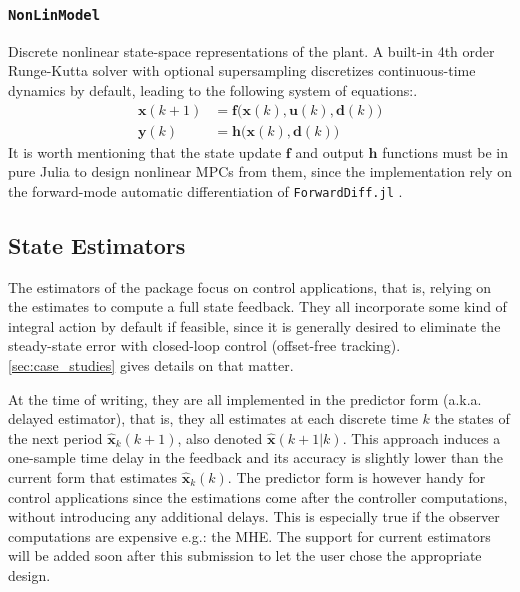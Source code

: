 \subsubsection{\textnormal{\texttt{NonLinModel}}}

Discrete nonlinear state-space representations of the plant. A built-in 4th order Runge-Kutta solver with optional supersampling discretizes continuous-time dynamics by default, leading to the following system of equations:. 
\begin{subequations}
\begin{align}
    \mathbf{x}(k+1) &= \mathbf{f}\big(\mathbf{x}(k), \mathbf{u}(k), \mathbf{d}(k)\big) \\
    \mathbf{y}(k)   &= \mathbf{h}\big( \mathbf{x}(k), \mathbf{d}(k) \big)
\end{align}
\end{subequations}
It is worth mentioning that the state update $\mathbf{f}$ and output $\mathbf{h}$ functions must be in pure Julia to design nonlinear MPCs from them, since the implementation rely on the forward-mode automatic differentiation of \texttt{ForwardDiff.jl} \citep{forwardDiff}.

\subsection{State Estimators}

The estimators of the package focus on control applications, that is, relying on the estimates to compute a full state feedback. They all incorporate some kind of integral action by default if feasible, since it is generally desired to eliminate the steady-state error with closed-loop control (offset-free tracking). \cref{sec:case_studies} gives details on that matter.

At the time of writing, they are all implemented in the predictor form (a.k.a. delayed estimator), that is, they all estimates at each discrete time $k$ the states of the next period $\mathbf{\hat{x}}_k(k+1)$, also denoted $\mathbf{\hat{x}}(k+1|k)$. This approach induces a one-sample time delay in the feedback and its accuracy is slightly lower than the current form that estimates $\mathbf{\hat{x}}_k(k)$. The predictor form is however handy for control applications since the estimations come after the controller computations, without introducing any additional delays. This is especially true if the observer computations are expensive e.g.: the MHE. The support for current estimators will be added soon after this submission to let the user chose the appropriate design.

